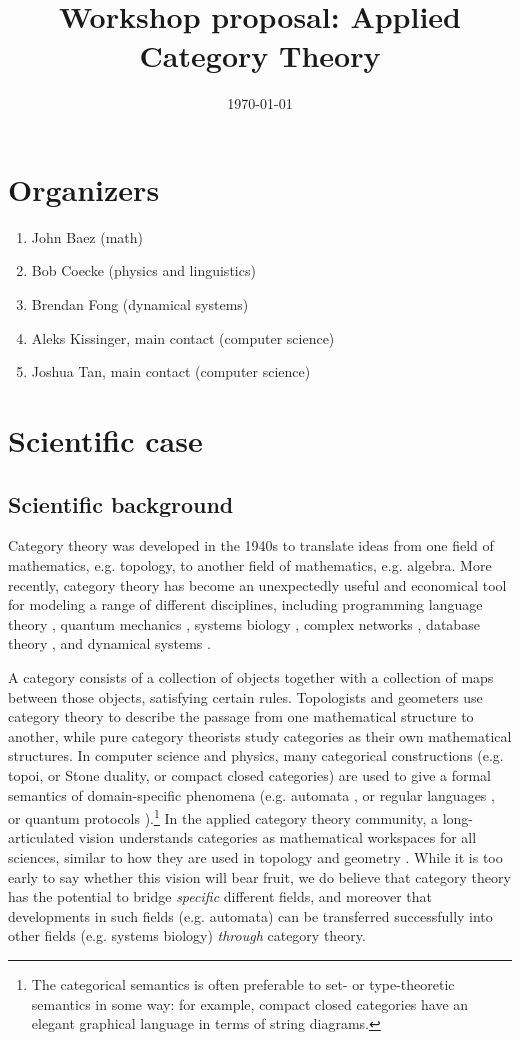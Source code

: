 \documentclass{article}
\title{Workshop proposal: Applied Category Theory}
\date{\today}
\begin{document}
\maketitle

\section{Organizers}
\begin{enumerate}
\item John Baez (math)
\item Bob Coecke (physics and linguistics) 
\item Brendan Fong (dynamical systems)
\item Aleks Kissinger, main contact (computer science)
\item Joshua Tan, main contact (computer science)
\end{enumerate}

\section{Scientific case}
\subsection{Scientific background}
Category theory was developed in the 1940s to translate ideas from one field of mathematics, e.g. topology, to another field of mathematics, e.g. algebra. More recently, category theory has become an unexpectedly useful and economical tool for modeling a range of different disciplines, including programming language theory \cite{moggi91}, quantum mechanics \cite{abramsky09}, systems biology \cite{rosen58}, complex networks \cite{baez15}, database theory \cite{rosebrugh03}, and dynamical systems \cite{spivak16}.

A category consists of a collection of objects together with a collection of maps between those objects, satisfying certain rules. Topologists and geometers use category theory to describe the passage from one mathematical structure to another, while pure category theorists study categories as their own mathematical structures. In computer science and physics, many categorical constructions (e.g. topoi, or Stone duality, or compact closed categories) are used to give a formal semantics of domain-specific phenomena (e.g. automata \cite{arbib05}, or regular languages \cite{pippenger97}, or quantum protocols \cite{abramsky09}).\footnote{The categorical semantics is often preferable to set- or type-theoretic semantics in some way: for example, compact closed categories have an elegant graphical language in terms of string diagrams.} In the applied category theory community, a long-articulated vision understands categories as mathematical workspaces for all sciences, similar to how they are used in topology and geometry \cite{spivak}. While it is too early to say whether this vision will bear fruit, we do believe that category theory has the potential to bridge \emph{specific} different fields, and moreover that developments in such fields (e.g. automata) can be transferred successfully into other fields (e.g. systems biology) \emph{through} category theory.
\end{document}

